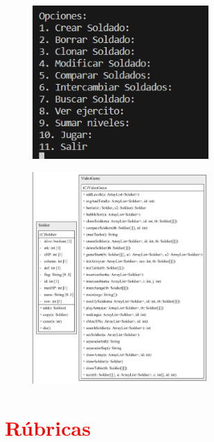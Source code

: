 \documentclass{article}
\begin{document}
	\begin{figure}[H]
		\centering
	\includegraphics[width=0.6\textwidth,keepaspectratio]{img/menu3.png}
	\end{figure}
	\begin{figure}[H]
		\centering
	\includegraphics[width=0.6\textwidth,keepaspectratio]{img/uml.png}
	\end{figure}
	
	
	\section{\textcolor{red}{Rúbricas}}
	
\end{document}
